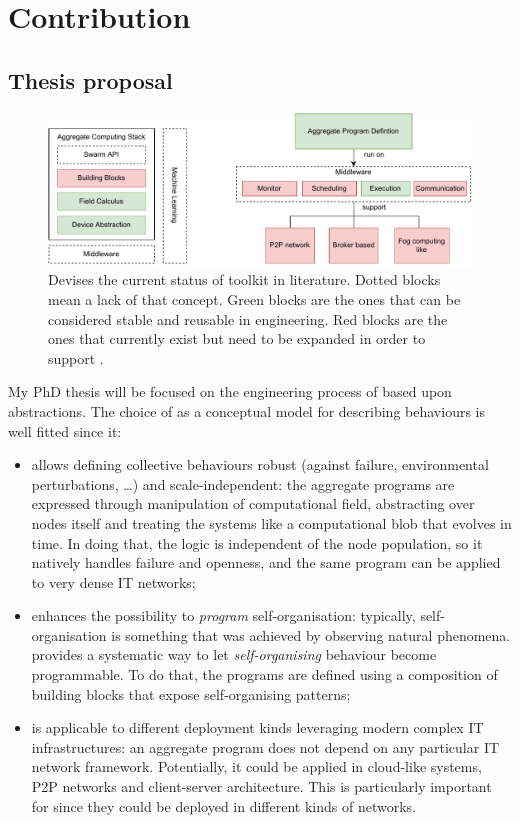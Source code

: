 \documentclass[11pt]{article}
\begin{document}
\section{Contribution} \label{contribution}
\subsection{Thesis proposal}
\begin{figure}
	\centering
	\includegraphics[width=\textwidth]{img/to-do-for-thesis.pdf}
	\caption{Devises the current status of \ac{} toolkit in literature. Dotted blocks mean a lack of that concept. Green blocks are the ones that can be considered stable and reusable in \cpsw{} engineering. Red blocks are the ones that currently exist but need to be expanded in order to support \cpsw{}.}
	\label{fig:current-state}
\end{figure}
My PhD thesis will be focused on the engineering process of \cpsw{} based upon \ac{} abstractions. The choice of \ac{} as a conceptual model for describing \cpsw{} behaviours is well fitted since it:
\begin{itemize}
	\item allows defining collective behaviours robust (against failure, environmental perturbations, \dots{}) and scale-independent: the aggregate programs are expressed through manipulation of computational field, abstracting over nodes itself and treating the systems like a computational blob that evolves in time. In doing that, the logic is independent of the node population, so it natively handles failure and openness, and the same program can be applied to very dense IT networks;
	\item enhances the possibility to \textit{program} self-organisation: typically, self-organisation is something that was achieved by observing natural phenomena. \ac{} provides a systematic way to let \textit{self-organising} behaviour become programmable. To do that, the programs are defined using a composition of building blocks that expose self-organising patterns;
	\item is applicable to different deployment kinds leveraging modern complex IT infrastructures: an aggregate program does not depend on any particular IT network framework. Potentially, it could be applied in cloud-like systems, P2P networks and client-server architecture. This is particularly important for \cpsw{} since they could be deployed in different kinds of networks.
\end{itemize}
\end{document}
